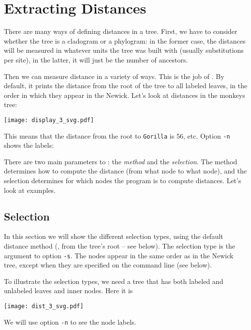 \section{Extracting Distances}

There are many ways of defining distances in a tree. First, we have to consider
whether the tree is a cladogram or a phylogram: in the former case, the
distances will be measured in whatever units the tree was built with (usually
substitutions per site), in the latter, it will just be the number of ancestors.

Then we can measure distance in a variety of ways. This is the job of
\distance. By default, it prints the distance from the root of the tree to all
labeled leaves, in the order in which they appear in the Newick. Let's look at
distances in the monkeys tree:

\begin{center}
\texttt{[image: display\_3\_svg.pdf]}
\end{center}


\begin{samepage}

\end{samepage}
This means that the distance from the root to \texttt{Gorilla} is 56, etc. Option \texttt{-n} shows the labels:

\begin{samepage}

\end{samepage}

There are two main parameters to \distance: the \emph{method} and the
\emph{selection}. The method determines how to compute the distance (from what
node to what node), and the selection determines for which nodes the program is
to compute distances. Let's look at examples.

\subsection{Selection}

In this section we will show the different selection types, using the default
distance method (\ie{}, from the tree's root -- see below). The selection type
is the argument to option \texttt{-s}.  The nodes appear in the same order as
in the Newick tree, except when they are specified on the command line (see
below).

To illustrate the selection types, we need a tree that has both labeled and
unlabeled leaves and inner nodes. Here it is 

\begin{center}
\texttt{[image: dist\_3\_svg.pdf]}
\end{center}
We will use option \texttt{-n} to see the node labels.

